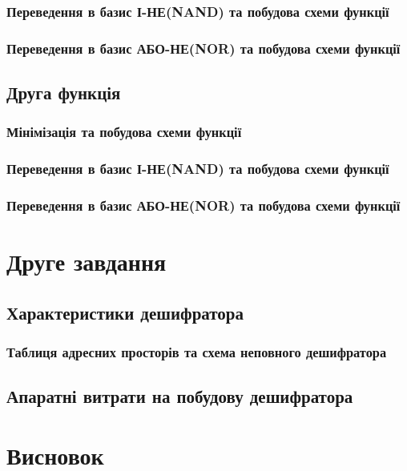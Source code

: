 \newpage
%
\subsection{Переведення в базис І-НЕ(NAND) та побудова схеми функції}
 
\newpage
%
\subsection{Переведення в базис АБО-НЕ(NOR) та побудова схеми функції}
 
\newpage
%
\section{Друга функція}

\newpage
\subsection{Мінімізація та побудова схеми функції}

\newpage
%
\subsection{Переведення в базис І-НЕ(NAND) та побудова схеми функції}

\newpage
%
\subsection{Переведення в базис АБО-НЕ(NOR) та побудова схеми функції}

\newpage
%
\chapter{Друге завдання}
\section{Характеристики дешифратора}

\newpage
\subsection{Таблиця адресних просторів та схема неповного дешифратора}

\newpage
%
\section{Апаратні витрати на побудову дешифратора}

\newpage
\chapter{Висновок}
